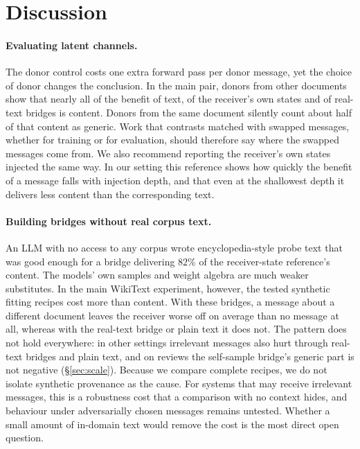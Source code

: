 \section{Discussion}
\label{sec:discussion}

\paragraph{Evaluating latent channels.}
The donor control costs one extra forward pass per donor message, yet the choice of donor changes the conclusion. In the main pair, donors from other documents show that nearly all of the benefit of text, of the receiver's own states and of real-text bridges is content. Donors from the same document silently count about half of that content as generic. Work that contrasts matched with swapped messages, whether for training \citep{du2025interlat} or for evaluation, should therefore say where the swapped messages come from. We also recommend reporting the receiver's own states injected the same way. In our setting this reference shows how quickly the benefit of a message falls with injection depth, and that even at the shallowest depth it delivers less content than the corresponding text.

\paragraph{Building bridges without real corpus text.}
An LLM with no access to any corpus wrote encyclopedia-style probe text that was good enough for a bridge delivering 82\% of the receiver-state reference's content. The models' own samples and weight algebra are much weaker substitutes. In the main WikiText experiment, however, the tested synthetic fitting recipes cost more than content. With these bridges, a message about a different document leaves the receiver worse off on average than no message at all, whereas with the real-text bridge or plain text it does not. The pattern does not hold everywhere: in other settings irrelevant messages also hurt through real-text bridges and plain text, and on reviews the self-sample bridge's generic part is not negative (\S\ref{sec:scale}). Because we compare complete recipes, we do not isolate synthetic provenance as the cause. For systems that may receive irrelevant messages, this is a robustness cost that a comparison with no context hides, and behaviour under adversarially chosen messages remains untested. Whether a small amount of in-domain text would remove the cost is the most direct open question. \SCALEDISCUSSION

